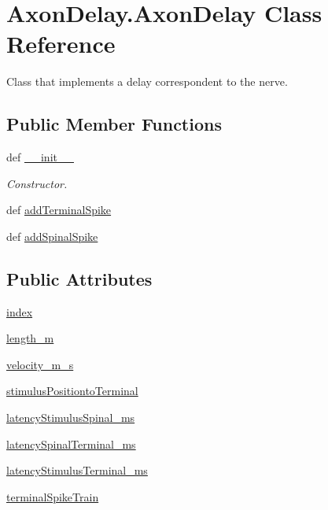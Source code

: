 \hypertarget{class_axon_delay_1_1_axon_delay}{\section{Axon\-Delay.\-Axon\-Delay Class Reference}
\label{class_axon_delay_1_1_axon_delay}
}


Class that implements a delay correspondent to the nerve.  


\subsection*{Public Member Functions}
\begin{DoxyCompactItemize}
\item 
def \hyperlink{class_axon_delay_1_1_axon_delay_ae4b6037beb2f833d82c5703bcb47ffb0}{\-\_\-\-\_\-init\-\_\-\-\_\-}
\begin{DoxyCompactList}\small\item\em Constructor. \end{DoxyCompactList}\item 
def \hyperlink{class_axon_delay_1_1_axon_delay_a49115bea963cde5e2c4317510d73cf7c}{add\-Terminal\-Spike}
\item 
def \hyperlink{class_axon_delay_1_1_axon_delay_a5483df94745af77bf54f707f9a05a0e0}{add\-Spinal\-Spike}
\end{DoxyCompactItemize}
\subsection*{Public Attributes}
\begin{DoxyCompactItemize}
\item 
\hyperlink{class_axon_delay_1_1_axon_delay_a5dbb9b5002d4b54bf347f48337bdb1c6}{index}
\item 
\hyperlink{class_axon_delay_1_1_axon_delay_a08ab7285929002db2108179ea9f5d5dd}{length\-\_\-m}
\item 
\hyperlink{class_axon_delay_1_1_axon_delay_a59cc448f95b38b88b7103c3058e8c397}{velocity\-\_\-m\-\_\-s}
\item 
\hyperlink{class_axon_delay_1_1_axon_delay_a3f6bb8f38c4474806544d01fbe9c0361}{stimulus\-Positionto\-Terminal}
\item 
\hyperlink{class_axon_delay_1_1_axon_delay_a81ea09febed911b8f5e4d56a5f434f8d}{latency\-Stimulus\-Spinal\-\_\-ms}
\item 
\hyperlink{class_axon_delay_1_1_axon_delay_aaa0b8daf2629cd7fa19d539fe2168d0f}{latency\-Spinal\-Terminal\-\_\-ms}
\item 
\hyperlink{class_axon_delay_1_1_axon_delay_a88845b9926b97db88174ce088d5af5e0}{latency\-Stimulus\-Terminal\-\_\-ms}
\item 
\hyperlink{class_axon_delay_1_1_axon_delay_aba392d8938766355063cf4bf3a87962d}{terminal\-Spike\-Train}
\end{DoxyCompactItemize}


